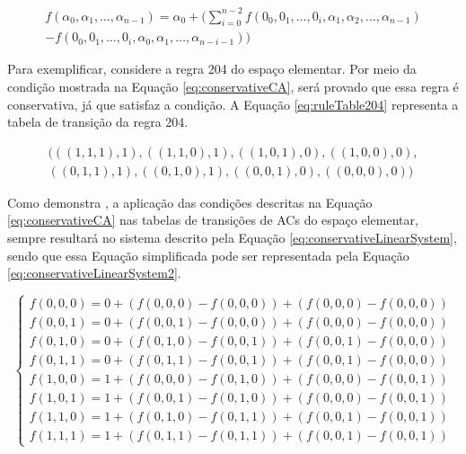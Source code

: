 	\begin{equation}
	\begin{split}
	f(\alpha_0,\alpha_1, \dots,\alpha_{n-1}) = \alpha_0 + (\sum_{i=0}^{n-2}f(0_0,0_1, \dots,0_i,\alpha_1,\alpha_2, \dots,\alpha_{n-1}) \\- f(0_0,0_1, \dots,0_i,\alpha_0,\alpha_1, \dots,\alpha_{n-i-1}))
	\label{eq:conservativeCA}
	\end{split}
	\end{equation}

	Para exemplificar, considere a regra 204 do espaço elementar. Por meio da condição mostrada na Equação \ref{eq:conservativeCA}, será provado que essa regra é conservativa, já que satisfaz a condição. A Equação \ref{eq:ruleTable204} representa a tabela de transição da regra 204.

	\begin{equation}
	\begin{split}
	(((1,1,1),1),((1,1,0),1),((1,0,1),0),((1,0,0),0),\\((0,1,1),1),((0,1,0),1),((0,0,1),0),((0,0,0),0))
	\label{eq:ruleTable204}
	\end{split}
	\end{equation}

	Como demonstra \cite{daCosta2014}, a aplicação das condições descritas na Equação \ref{eq:conservativeCA} nas tabelas de transições de ACs do espaço elementar, sempre resultará no sistema descrito pela Equação \ref{eq:conservativeLinearSystem}, sendo que essa Equação simplificada pode ser representada pela Equação \ref{eq:conservativeLinearSystem2}.

	\begin{equation}
	\left\{\begin{matrix}
	 f(0,0,0) = 0 + (f(0,0,0) - f(0,0,0)) + (f(0,0,0) - f(0,0,0))\\ 
	 f(0,0,1) = 0 + (f(0,0,1) - f(0,0,0)) + (f(0,0,0) - f(0,0,0))\\ 
	 f(0,1,0) = 0 + (f(0,1,0) - f(0,0,1)) + (f(0,0,1) - f(0,0,0))\\ 
	 f(0,1,1) = 0 + (f(0,1,1) - f(0,0,1)) + (f(0,0,1) - f(0,0,0))\\ 
	 f(1,0,0) = 1 + (f(0,0,0) - f(0,1,0)) + (f(0,0,0) - f(0,0,1))\\ 
	 f(1,0,1) = 1 + (f(0,0,1) - f(0,1,0)) + (f(0,0,0) - f(0,0,1))\\ 
	 f(1,1,0) = 1 + (f(0,1,0) - f(0,1,1)) + (f(0,0,1) - f(0,0,1))\\ 
	 f(1,1,1) = 1 + (f(0,1,1) - f(0,1,1)) + (f(0,0,1) - f(0,0,1))
	\end{matrix}\right.
	\label{eq:conservativeLinearSystem}
	\end{equation}

